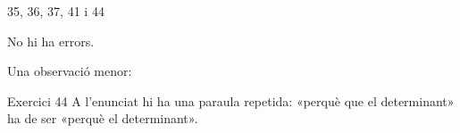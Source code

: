 
%
        {35, 36, 37, 41 i 44}

\noindent
No hi ha errors.


\ifobs
\bigskip
\noindent
Una observació menor:\par\nopagebreak

\begin{observacio}{Exercici 44}
  A l'enunciat hi ha una paraula repetida: «perquè que el determinant» ha de
  ser «perquè el determinant».
\end{observacio}
\fi
